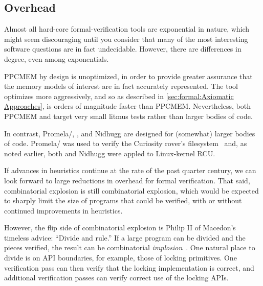 \subsection{Overhead}
\label{sec:future:Overhead}

Almost all hard-core formal-verification tools are exponential
in nature, which might seem discouraging until you consider that
many of the most interesting software questions are in fact undecidable.
However, there are differences in degree, even among exponentials.

PPCMEM by design is unoptimized, in order to provide greater assurance
that the memory models of interest are in fact accurately represented.
The  tool optimizes more aggressively, and so as described in
\cref{sec:formal:Axiomatic Approaches}, is orders of magnitude
faster than PPCMEM.
Nevertheless, both PPCMEM and  target very small litmus tests
rather than larger bodies of code.

In contrast, Promela/, , and Nidhugg are designed for
(somewhat) larger bodies of code.
Promela/ was used to verify the Curiosity rover's
filesystem~\cite{DBLP:journals/amai/GroceHHJX14} and, as noted earlier,
both  and Nidhugg were appled to Linux-kernel RCU.

If advances in heuristics continue at the rate of the past quarter
century, we can look forward to large reductions in overhead for
formal verification.
That said, combinatorial explosion is still combinatorial explosion,
which would be expected to sharply limit the size of programs that
could be verified, with or without continued improvements in
heuristics.

However, the flip side of combinatorial explosion is Philip II of
Macedon's timeless advice: ``Divide and rule.''
If a large program can be divided and the pieces verified, the result
can be combinatorial \emph{implosion}~\cite{PaulEMcKenney2011Verico}.
One natural place to divide is on API boundaries, for example, those
of locking primitives.
One verification pass can then verify that the locking implementation
is correct, and additional verification passes can verify correct
use of the locking APIs.

\begin{listing}[tbp]

\caption{Emulating Locking with }
\label{lst:future:Emulating Locking with cmpxchg}
\end{listing}

